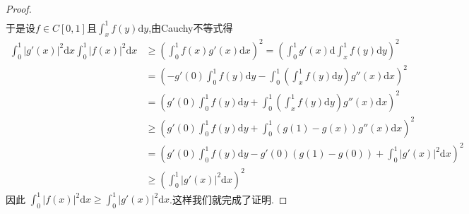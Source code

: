 \documentclass[../../main.tex]{subfiles}%
\begin{document}
\begin{proof}
\begin{align*}
\end{align*}
于是设$f\in C\left[ 0,1 \right]\text{且}\int_x^1{f\left( y \right) \mathrm{d}y}$,由Cauchy不等式得
\begin{align*}
\int_0^1 |g'(x)|^2 \mathrm{d}x \int_0^1 |f(x)|^2 \mathrm{d}x &\geqslant \left( \int_0^1 f(x) g'(x) \mathrm{d}x \right)^2 = \left( \int_0^1 g'(x) \mathrm{d} \int_x^1 f(y) \mathrm{d}y \right)^2 \\
&= \left( -g'(0) \int_0^1 f(y) \mathrm{d}y - \int_0^1 \left( \int_x^1 f(y) \mathrm{d}y \right) g''(x) \mathrm{d}x \right)^2 \\
&= \left( g'(0) \int_0^1 f(y) \mathrm{d}y + \int_0^1 \left( \int_x^1 f(y) \mathrm{d}y \right) g''(x) \mathrm{d}x \right)^2 \\
&\geqslant \left( g'(0) \int_0^1 f(y) \mathrm{d}y + \int_0^1 (g(1) - g(x)) g''(x) \mathrm{d}x \right)^2 \\
&= \left( g'(0) \int_0^1 f(y) \mathrm{d}y - g'(0) (g(1) - g(0)) + \int_0^1 |g'(x)|^2 \mathrm{d}x \right)^2 \\
&\geqslant \left( \int_0^1 |g'(x)|^2 \mathrm{d}x \right)^2
\end{align*}
因此 $\int_0^1 |f(x)|^2 \mathrm{d}x \geqslant \int_0^1 |g'(x)|^2 \mathrm{d}x$.这样我们就完成了证明.
\end{proof}
\end{document}
